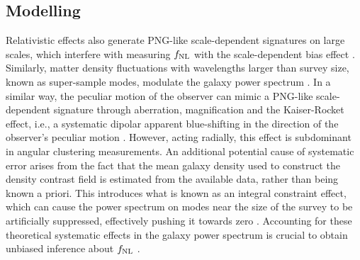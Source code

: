  \subsection{Modelling}
 
Relativistic effects also generate PNG-like scale-dependent signatures on large scales, which interfere with measuring $f_{\rm NL}$ with the scale-dependent bias effect \citep{wang2020}. Similarly, matter density fluctuations with wavelengths larger than survey size, known as super-sample modes, modulate the galaxy power spectrum \citep{castorina2020JCAP}. In a similar way, the peculiar motion of the observer can mimic a PNG-like scale-dependent signature through aberration, magnification and the Kaiser-Rocket effect, i.e., a systematic dipolar apparent blue-shifting in the direction of the observer's peculiar motion \citep{2021JCAP...11..027B}. However, acting radially, this effect is subdominant in angular clustering measurements. An additional potential cause of systematic error arises from the fact that the mean galaxy density used to construct the density contrast field is estimated from the available data, rather than being known a priori. This introduces what is known as an integral constraint effect, which can cause the power spectrum on modes near the size of the survey to be artificially suppressed, effectively pushing it towards zero \citep{peacock1991large,de2019integral}. Accounting for these theoretical systematic effects in the galaxy power spectrum is crucial to obtain unbiased inference about $f_{\rm NL}$ \citep[see, e.g.,][]{riquelme2022primordial}.
 
 
